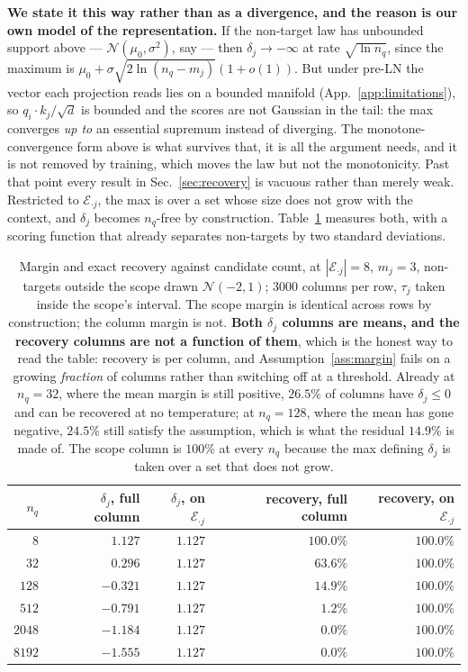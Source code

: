 \documentclass{article}
\begin{document}
\textbf{We state it this way rather than as a divergence, and the reason is our own model of the
representation.} If the non-target law has unbounded support above --- $\mathcal{N}(\mu_0,
\sigma^2)$, say --- then $\delta_j\to-\infty$ at rate $\sqrt{\ln n_q}$, since the maximum is
$\mu_0+\sigma\sqrt{2\ln(n_q-m_j)}(1+o(1))$. But under pre-LN the vector each projection reads
lies on a bounded manifold (App.~\ref{app:limitations}), so $q_i\!\cdot\!k_j/\sqrt d$ is
bounded and the scores are not Gaussian in the tail: the max converges \emph{up to} an essential
supremum instead of diverging. The monotone-convergence form above is what survives that, it is
all the argument needs, and it is not removed by training, which moves the law but not the
monotonicity. Past that point every result in Sec.~\ref{sec:recovery} is
vacuous rather than merely weak. Restricted to $\mathcal{E}_{\cdot j}$, the max is over a set
whose size does not grow with the context, and $\delta_j$ becomes $n_q$-free by construction.
Table~\ref{tab:margin} measures both, with a scoring function that already separates non-targets
by two standard deviations.

\begin{table}[h]
\centering
\caption{Margin and exact recovery against candidate count, at $|\mathcal{E}_{\cdot j}|=8$,
$m_j=3$, non-targets outside the scope drawn $\mathcal{N}(-2,1)$; $3000$ columns per row,
$\tau_j$ taken inside the scope's interval. The scope margin is identical across rows by
construction; the column margin is not. \textbf{Both $\delta_j$ columns are means, and the
recovery columns are not a function of them}, which is the honest way to read the table: recovery
is per column, and Assumption~\ref{ass:margin} fails on a growing \emph{fraction} of columns
rather than switching off at a threshold. Already at $n_q=32$, where the mean margin is still
positive, $26.5\%$ of columns have $\delta_j\le0$ and can be recovered at no temperature; at
$n_q=128$, where the mean has gone negative, $24.5\%$ still satisfy the assumption, which is what
the residual $14.9\%$ is made of. The scope column is $100\%$ at every $n_q$ because the max
defining $\delta_j$ is taken over a set that does not grow.}
\label{tab:margin}
\small
\begin{tabular}{@{}rrrrr@{}}
\toprule
$n_q$ & $\delta_j$, full column & $\delta_j$, on $\mathcal{E}_{\cdot j}$ & recovery, full column & recovery, on $\mathcal{E}_{\cdot j}$ \\
\midrule
$8$    & $\phantom{-}1.127$ & $1.127$ & $100.0\%$ & $100.0\%$ \\
$32$   & $\phantom{-}0.296$ & $1.127$ & $\phantom{0}63.6\%$ & $100.0\%$ \\
$128$  & $-0.321$ & $1.127$ & $\phantom{0}14.9\%$ & $100.0\%$ \\
$512$  & $-0.791$ & $1.127$ & $\phantom{00}1.2\%$ & $100.0\%$ \\
$2048$ & $-1.184$ & $1.127$ & $\phantom{00}0.0\%$ & $100.0\%$ \\
$8192$ & $-1.555$ & $1.127$ & $\phantom{00}0.0\%$ & $100.0\%$ \\
\bottomrule
\end{tabular}
\end{table}
\end{document}
